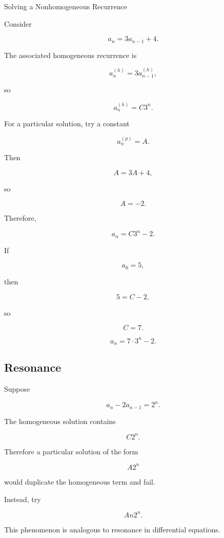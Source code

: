 \begin{workedexamplebox}{Solving a Nonhomogeneous Recurrence}

Consider

\[
a_n=3a_{n-1}+4.
\]

The associated homogeneous recurrence is

\[
a_n^{(h)}=3a_{n-1}^{(h)},
\]

so

\[
a_n^{(h)}=C3^n.
\]

For a particular solution, try a constant

\[
a_n^{(p)}=A.
\]

Then

\[
A=3A+4,
\]

so

\[
A=-2.
\]

Therefore,

\[
a_n=C3^n-2.
\]

If

\[
a_0=5,
\]

then

\[
5=C-2,
\]

so

\[
C=7.
\]

\begin{answerbox}
\[
\boxed{
a_n=7\cdot3^n-2.
}
\]
\end{answerbox}

\end{workedexamplebox}

\subsection{Resonance}
\label{subsec:recurrence-resonance}

Suppose

\[
a_n-2a_{n-1}=2^n.
\]

The homogeneous solution contains

\[
C2^n.
\]

Therefore a particular solution of the form

\[
A2^n
\]

would duplicate the homogeneous term and fail.

Instead, try

\[
\boxed{
An2^n.
}
\]

This phenomenon is analogous to resonance in differential equations.


